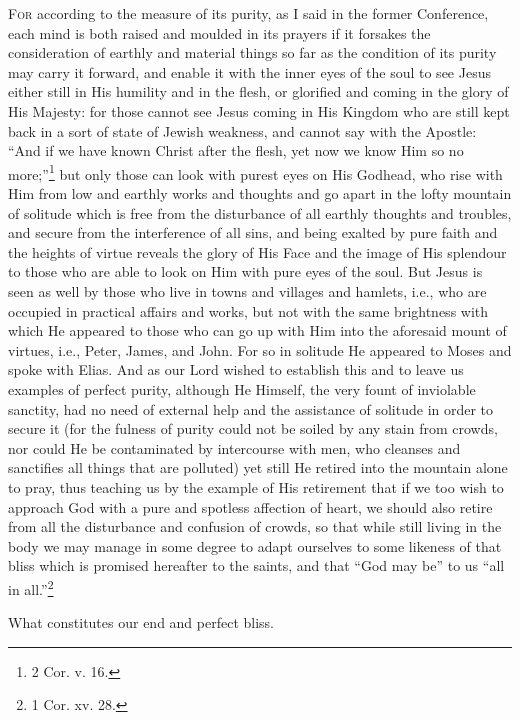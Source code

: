 \textsc{For} according to the measure of its purity, as I said in the former Conference, each mind is both raised and moulded in its prayers if it forsakes the consideration of earthly and material things so far as the condition of its purity may carry it forward, and enable it with the inner eyes of the soul to see Jesus either still in His humility and in the flesh, or glorified and coming in the glory of His Majesty: for those cannot see Jesus coming in His Kingdom who are still kept back in a sort of state of Jewish weakness, and cannot say with the Apostle: “And if we have known Christ after the flesh, yet now we know Him so no more;”\footnote{2 Cor. v. 16.} but only those can look with purest eyes on His Godhead, who rise with Him from low and earthly works and thoughts and go apart in the lofty mountain of solitude which is free from the disturbance of all earthly thoughts and troubles, and secure from the interference of all sins, and being exalted by pure faith and the heights of virtue reveals the glory of His Face and the image of His splendour to those who are able to look on Him with pure eyes of the soul. But Jesus is seen as well by those who live in towns and villages and hamlets, i.e., who are occupied in practical affairs and works, but not with the same brightness with which He appeared to those who can go up with Him into the aforesaid mount of virtues, i.e., Peter, James, and John. For so in solitude He appeared to Moses and spoke with Elias. And as our Lord wished to establish this and to leave us examples of perfect purity, although He Himself, the very fount of inviolable sanctity, had no need of external help and the assistance of solitude in order to secure it (for the fulness of purity could not be soiled by any stain from crowds, nor could He be contaminated by intercourse with men, who cleanses and sanctifies all things that are polluted) yet still He retired into the mountain alone to pray, thus teaching us by the example of His retirement that if we too wish to approach God with a pure and spotless affection of heart, we should also retire from all the disturbance and confusion of crowds, so that while still living in the body we may manage in some degree to adapt ourselves to some likeness of that bliss which is promised hereafter to the saints, and that “God may be” to us “all in all.”\footnote{1 Cor. xv. 28.}


What constitutes our end and perfect bliss.

